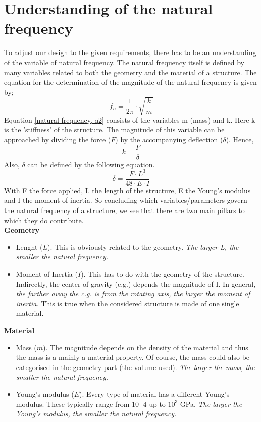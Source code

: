 \section{Understanding of the natural frequency}
To adjust our design to the given requirements, there has to be an understanding of the variable of natural frequency. The natural frequency itself is defined by many variables related to both the geometry and the material of a structure. The equation for the determination of the magnitude of the natural frequency is given by;
\begin{equation} \label{natural frequency, q2}
    f_n = \frac{1}{2\pi} \cdot \sqrt{\frac{k}{m}}
\end{equation}
Equation \eqref{natural frequency, q2} consists of the variables m (mass) and k. Here k is the 'stiffness' of the structure. The magnitude of this variable can be approached by dividing the force ($F$) by the accompanying deflection ($\delta$). Hence,
\begin{equation}
    k = \frac{F}{\delta}
\end{equation}
Also, $\delta$ can be defined by the following equation.
\begin{equation}
    \delta = \frac{F \cdot L^3}{48 \cdot E \cdot I}
\end{equation}
With F the force applied, L the length of the structure, E the Young's modulus and I the moment of inertia.
So concluding which variables/parameters govern the natural frequency of a structure, we see that there are two main pillars to which they do contribute. \\
\textbf{Geometry}
\begin{itemize}
    \item Lenght ($L$). This is obviously related to the geometry. \textit{The larger L, the smaller the natural frequency.}
    \item Moment of Inertia ($I$). This has to do with the geometry of the structure. Indirectly, the center of gravity (c.g.) depends the magnitude of I. In general, \textit{the farther away the c.g. is from the rotating axis, the larger the moment of inertia.} This is true when the considered structure is made of one single material.
\end{itemize}
\textbf{Material}
\begin{itemize}
    \item Mass ($m$). The magnitude depends on the density of the material and thus the mass is a mainly a material property.
    Of course, the mass could also be categorised in the geometry part (the volume used). \textit{The larger the mass, the smaller the natural frequency.}
    \item Young's modulus ($E$). Every type of material has a different Young's modulus. These typically range from $10^-4$ up to $10^3$ GPa. \textit{The larger the Young's modulus, the smaller the natural frequency.}
\end{itemize}
